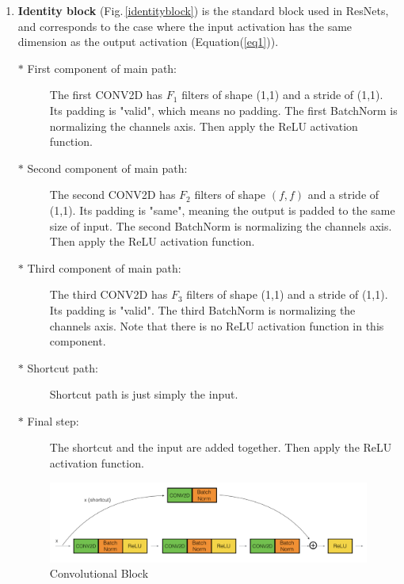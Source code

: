\begin{enumerate}
\item  \textbf{Identity block} (Fig.\,\ref{identityblock}) is the standard block used in ResNets, and corresponds to the case where the input activation has the same dimension as the output activation (Equation(\ref{eq1})).
    \begin{description}
      \item[$\ast$ First component of main path:] The first CONV2D has $F_1$ filters of shape (1,1) and a stride of (1,1). Its padding is "valid", which means no padding. The first BatchNorm is normalizing the channels axis. Then apply the ReLU activation function. 
      \item[$\ast$ Second component of main path:] The second CONV2D has $F_2$ filters of shape $(f,f)$ and a stride of (1,1). Its padding is "same", meaning the output is padded to the same size of input. The second BatchNorm is normalizing the channels axis. Then apply the ReLU activation function. 
      \item[$\ast$ Third component of main path:] The third CONV2D has $F_3$ filters of shape (1,1) and a stride of (1,1). Its padding is "valid". The third BatchNorm is normalizing the channels axis. Note that there is no ReLU activation function in this component.
      \item[$\ast$ Shortcut path:] Shortcut path is just simply the input.
      \item[$\ast$ Final step:] The shortcut and the input are added together. Then apply the ReLU activation function.
    \end{description}
    
\begin{figure}[h]
\centering
\includegraphics[width=\textwidth]{Figs/convolutionblock.png}
\caption{Convolutional Block}
\label{convolutionblock}
\end{figure}


\end{enumerate}
